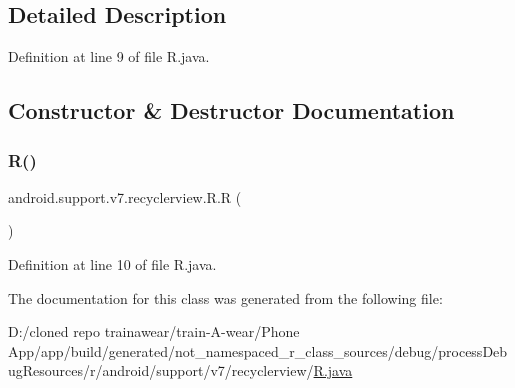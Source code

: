 \subsection{Detailed Description}


Definition at line 9 of file R.\+java.



\subsection{Constructor \& Destructor Documentation}
\mbox{\label{classandroid_1_1support_1_1v7_1_1recyclerview_1_1_r_aa060a454ea7ef2c32580bebc95d5456f}} 
\subsubsection{\texorpdfstring{R()}{R()}}
{\footnotesize\ttfamily android.\+support.\+v7.\+recyclerview.\+R.\+R (\begin{DoxyParamCaption}{ }\end{DoxyParamCaption})\hspace{0.3cm}{\ttfamily [private]}}



Definition at line 10 of file R.\+java.


\begin{DoxyCode}{0}

\end{DoxyCode}


The documentation for this class was generated from the following file\+:\begin{DoxyCompactItemize}
\item 
D\+:/cloned repo trainawear/train-\/\+A-\/wear/\+Phone App/app/build/generated/not\+\_\+namespaced\+\_\+r\+\_\+class\+\_\+sources/debug/process\+Debug\+Resources/r/android/support/v7/recyclerview/\mbox{\hyperlink{process_debug_resources_2r_2android_2support_2v7_2recyclerview_2_r_8java}{R.\+java}}\end{DoxyCompactItemize}
